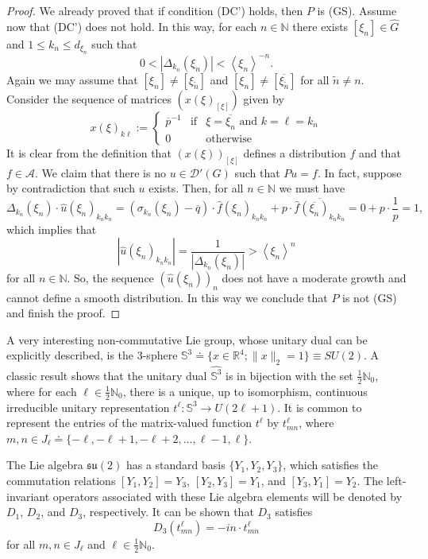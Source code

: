 \documentclass[sn-mathphys-num]{sn-jnl}%
\numberwithin{equation}{section}
\theoremstyle{thmstyleone}
\theoremstyle{thmstyletwo}
\theoremstyle{thmstylethree}
\def\jp#1{{\left\langle{#1}\right\rangle}}
\begin{document}
\begin{proof} We already proved that if condition (DC') holds, then $P$ is (GS). Assume now that (DC') does not hold. In this way, for each $n \in \mathbb{N}$ there exists $[\xi_n] \in \widehat{G}$ and $1 \leq k_n \leq d_{\xi_n}$ such that 
	$$0<|\Delta_{k_n}(\xi_n)|<\jp{\xi_n}^{-n}.$$	
Again we may assume that $[\xi_n] \neq [\xi_{\tilde{n}}]$ and $[\xi_n] \neq [\overline{\xi_{\tilde{n}}}]$ for all ${\tilde{n}} \neq n$. Consider the sequence of matrices $(x(\xi)_{[\xi]})$ given by
$$x(\xi)_{k\ell}:= \left \{ \begin{array}{ccc} \overline{p}^{-1} & \textrm{if} & \xi=\overline{\xi_n} \textrm{ and } k=\ell=k_n \\ 0 &  & \textrm{otherwise} \end{array}  \right.  $$ 
It is clear from the definition that $(x(\xi))_{[\xi]}$ defines a distribution $f$ and that $f \in \mathcal{A}$. We claim that there is no $u \in \mathcal{D}'(G)$ such that $Pu=f$. In fact, suppose by contradiction that such $u$ exists. Then, for all $n\in \mathbb{N}$ we must have
$$\Delta_{k_n}(\xi_n) \cdot \widehat{u}(\xi_n)_{k_n k_n} =(\sigma_{k_n}(\xi_n)-\overline{q})\cdot \widehat{f}(\xi_n)_{k_n k_n}+p \cdot \overline{ \widehat{f}(\overline{\xi_n})_{k_n k_n}}=0+p \cdot \frac{1}{p}=1,$$
which implies that
$$|\widehat{u}(\xi_n)_{k_n k_n}| = \frac{1}{|\Delta_{k_n}(\xi_n)|} > \jp{\xi_n}^n$$
for all $n \in \mathbb{N}$. So, the sequence $(\widehat{u}(\xi_n))_n$ does not have a moderate growth and cannot define a smooth distribution. In this way we conclude that $P$ is not (GS) and finish the proof. 
\end{proof}

A very interesting non-commutative Lie group, whose unitary dual can be explicitly described, is the $3$-sphere $\mathbb{S}^3 \doteq \{x \in \mathbb{R}^4; \|x\|_2 = 1\} \equiv SU(2)$. A classic result shows that the unitary dual $\widehat{\mathbb{S}^3}$ is in bijection with the set $\frac{1}{2}\mathbb{N}_0$, where for each $\ell \in \frac{1}{2}\mathbb{N}_0$, there is a unique, up to isomorphism, continuous irreducible unitary representation $t^\ell : \mathbb{S}^3 \to U(2\ell + 1)$. It is common to represent the entries of the matrix-valued function $t^\ell$ by $t^\ell_{mn}$, where $m, n \in J_\ell \doteq \{-\ell, -\ell + 1, -\ell + 2, \dots, \ell - 1, \ell\}$.

The Lie algebra $\mathfrak{su}(2)$ has a standard basis $\{Y_1, Y_2, Y_3\}$, which satisfies the commutation relations $[Y_1, Y_2] = Y_3$, $[Y_2, Y_3] = Y_1$, and $[Y_3, Y_1] = Y_2$. The left-invariant operators associated with these Lie algebra elements will be denoted by $D_1$, $D_2$, and $D_3$, respectively. It can be shown that $D_3$ satisfies
$$
D_3(t^\ell_{mn}) = -in \cdot t^\ell_{mn}
$$
for all $m, n \in J_\ell$ and $\ell \in \frac{1}{2}\mathbb{N}_0$. 
\end{document}

